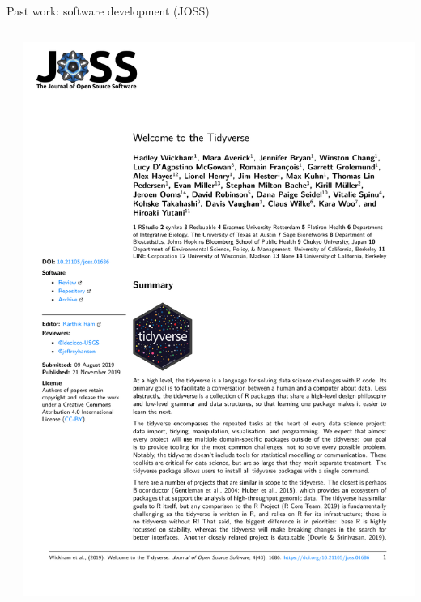 \documentclass[aspectratio=169]{beamer}
\theoremstyle{remark}
\begin{document}
\begin{frame}{Past work: software development (JOSS)}
\begin{columns}
\begin{column}{0.5\textwidth}
        \end{column}
        \begin{column}{0.5\textwidth}
            \centering
            \includegraphics[height=0.95\textheight, page=1, trim={5.5cm 9.4cm 0 3.5cm}, clip]{./papers/tidyverse.pdf}
        \end{column}
    \end{columns}
\end{frame}



\end{document}
